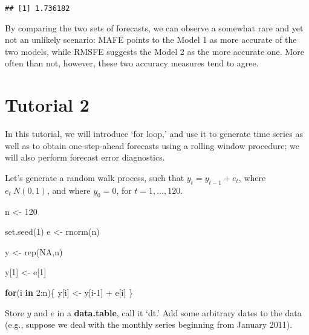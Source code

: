 \documentclass[
  oneside]{book}
\newenvironment{Shaded}{\begin{snugshade}}{\end{snugshade}}
\newcommand{\AttributeTok}[1]{\textcolor[rgb]{0.77,0.63,0.00}{#1}}
\newcommand{\ConstantTok}[1]{\textcolor[rgb]{0.00,0.00,0.00}{#1}}
\newcommand{\ControlFlowTok}[1]{\textcolor[rgb]{0.13,0.29,0.53}{\textbf{#1}}}
\newcommand{\DecValTok}[1]{\textcolor[rgb]{0.00,0.00,0.81}{#1}}
\newcommand{\FunctionTok}[1]{\textcolor[rgb]{0.00,0.00,0.00}{#1}}
\newcommand{\NormalTok}[1]{#1}
\newcommand{\OtherTok}[1]{\textcolor[rgb]{0.56,0.35,0.01}{#1}}
\newcommand{\SpecialCharTok}[1]{\textcolor[rgb]{0.00,0.00,0.00}{#1}}
\newcommand{\StringTok}[1]{\textcolor[rgb]{0.31,0.60,0.02}{#1}}
\begin{document}
\begin{verbatim}
## [1] 1.736182
\end{verbatim}

By comparing the two sets of forecasts, we can observe a somewhat rare and yet not an unlikely scenario: MAFE points to the Model 1 as more accurate of the two models, while RMSFE suggests the Model 2 as the more accurate one. More often than not, however, these two accuracy measures tend to agree.

\hypertarget{tutorial-2}{%
\chapter*{Tutorial 2}\label{tutorial-2}}

In this tutorial, we will introduce `for loop,' and use it to generate time series as well as to obtain one-step-ahead forecasts using a rolling window procedure; we will also perform forecast error diagnostics.

Let's generate a random walk process, such that \(y_{t} = y_{t-1}+e_{t}\), where \(e_{t} ~ N(0,1)\), and where \(y_{0}=0\), for \(t=1,\ldots,120\).

\begin{Shaded}
\begin{Highlighting}[]
\NormalTok{n }\OtherTok{\textless{}{-}} \DecValTok{120}

\FunctionTok{set.seed}\NormalTok{(}\DecValTok{1}\NormalTok{)}
\NormalTok{e }\OtherTok{\textless{}{-}} \FunctionTok{rnorm}\NormalTok{(n)}

\NormalTok{y }\OtherTok{\textless{}{-}} \FunctionTok{rep}\NormalTok{(}\ConstantTok{NA}\NormalTok{,n)}

\NormalTok{y[}\DecValTok{1}\NormalTok{] }\OtherTok{\textless{}{-}}\NormalTok{ e[}\DecValTok{1}\NormalTok{]}

\ControlFlowTok{for}\NormalTok{(i }\ControlFlowTok{in} \DecValTok{2}\SpecialCharTok{:}\NormalTok{n)\{}
\NormalTok{  y[i] }\OtherTok{\textless{}{-}}\NormalTok{ y[i}\DecValTok{{-}1}\NormalTok{] }\SpecialCharTok{+}\NormalTok{ e[i]}
\NormalTok{\}}
\end{Highlighting}
\end{Shaded}

Store \(y\) and \(e\) in a \textbf{data.table}, call it `dt.' Add some arbitrary dates to the data (e.g., suppose we deal with the monthly series beginning from January 2011).

\begin{Shaded}
\end{Shaded}
\end{document}
